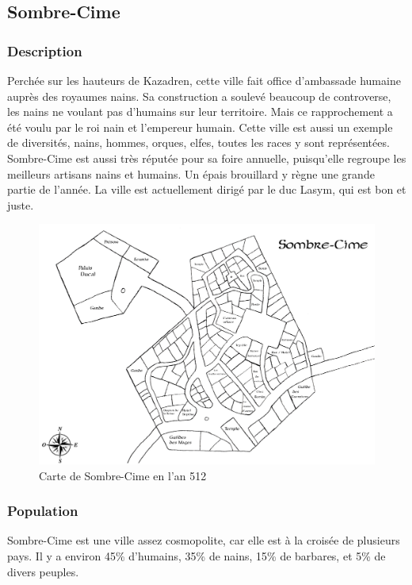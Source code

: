 \subsection{Sombre-Cime}
\subsubsection{Description}
\hypertarget{sombrecime}{}Perchée sur les hauteurs de Kazadren, cette ville fait office d’ambassade humaine auprès des royaumes nains. Sa construction a soulevé beaucoup de controverse, les nains ne voulant pas d’humains sur leur territoire. Mais ce rapprochement a été voulu par le roi nain et l’empereur humain. Cette ville est aussi un exemple de diversités, nains, hommes, orques, elfes, toutes les races y sont représentées. Sombre-Cime est aussi très réputée pour sa foire annuelle, puisqu’elle regroupe les meilleurs artisans nains et humains. Un épais brouillard y règne une grande partie de l’année. La ville est actuellement dirigé par le duc Lasym, qui est bon et juste.
\begin{figure}
 \begin{center}
   \includegraphics[scale=1.14, angle=90]{./Ressources/medieval/Carte_sombre_cime.jpg}
   \caption{Carte de Sombre-Cime en l'an 512}
 \end{center}
\end{figure}
\subsubsection{Population}
Sombre-Cime est une ville assez cosmopolite, car elle est à la croisée de plusieurs pays.
Il y a environ 45\% d'humains, 35\% de nains, 15\% de barbares, et 5\% de divers peuples.
